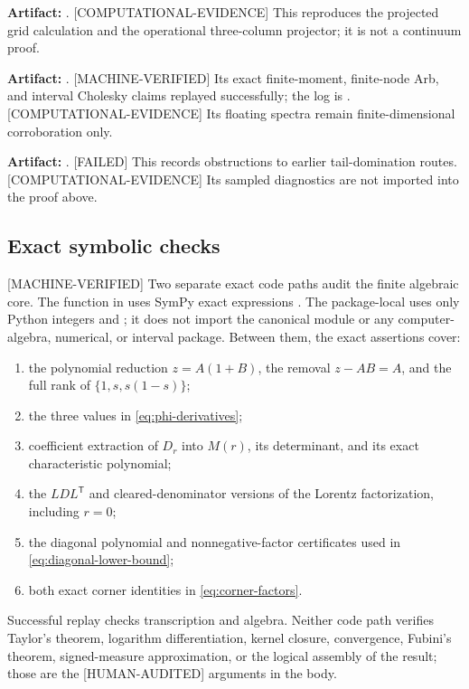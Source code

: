 \documentclass[11pt]{article}
\theoremstyle{plain}
\theoremstyle{definition}
\theoremstyle{remark}
\newcommand{\status}[1]{\textnormal{\textsf{\footnotesize[#1]}}}
\newcommand{\MachineVerified}{\status{MACHINE-VERIFIED}}
\newcommand{\HumanAudited}{\status{HUMAN-AUDITED}}
\newcommand{\ComputationalEvidence}{\status{COMPUTATIONAL-EVIDENCE}}
\newcommand{\FailedStatus}{\status{FAILED}}
\begin{document}
\medskip
\noindent\textbf{Artifact:} .
\ComputationalEvidence{} This reproduces the projected grid calculation and
the operational three-column projector; it is not a continuum proof.

\medskip
\noindent\textbf{Artifact:} .
\MachineVerified{} Its exact finite-moment, finite-node Arb, and interval
Cholesky claims replayed successfully; the log is
.
\ComputationalEvidence{} Its floating spectra remain finite-dimensional
corroboration only.

\medskip
\noindent\textbf{Artifact:} .
\FailedStatus{} This records obstructions to earlier tail-domination routes.
\ComputationalEvidence{} Its sampled diagnostics are not imported into the
proof above.

\subsection{Exact symbolic checks}
\label{app:symbolic}

\MachineVerified{} Two separate exact code paths audit the finite algebraic
core.  The function  in
 uses SymPy exact expressions \cite{sympy}.
The package-local
 uses only Python integers
and ; it does not import the canonical module or any
computer-algebra, numerical, or interval package.  Between them, the exact
assertions cover:
\begin{enumerate}[label=(\arabic*)]
  \item the polynomial reduction \(z=A(1+B)\), the removal \(z-AB=A\), and
        the full rank of \(\{1,s,s(1-s)\}\);
  \item the three values in \eqref{eq:phi-derivatives};
  \item coefficient extraction of \(D_r\) into \(M(r)\), its determinant, and
        its exact characteristic polynomial;
  \item the \(LDL^{\mathsf T}\) and cleared-denominator versions of the Lorentz
        factorization, including \(r=0\);
  \item the diagonal polynomial and nonnegative-factor certificates used in
        \eqref{eq:diagonal-lower-bound};
  \item both exact corner identities in \eqref{eq:corner-factors}.
\end{enumerate}
Successful replay checks transcription and algebra.  Neither code path verifies
Taylor's theorem, logarithm differentiation, kernel closure, convergence,
Fubini's theorem, signed-measure approximation, or the logical assembly of the
result; those are the \HumanAudited{} arguments in the body.
\end{document}

